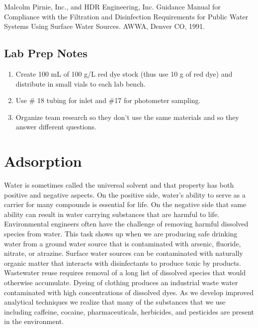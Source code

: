 \documentclass[letterpaper,10pt,english]{sphinxmanual}
\begin{document}
Malcolm Pirnie, Inc., and HDR Engineering, Inc. Guidance Manual for Compliance with the Filtration and Disinfection Requirements for Public Water Systems Using Surface Water Sources. AWWA, Denver CO, 1991.


\section{Lab Prep Notes}
\label{\detokenize{Reactor_Characteristics/Reactor_Characteristics:lab-prep-notes}}\label{\detokenize{Reactor_Characteristics/Reactor_Characteristics:heading-reactor-lab-prep-notes}}\begin{enumerate}
\item {} 
Create 100 mL of 100 g/L red dye stock (thus use 10 g of red dye) and distribute in small vials to each lab bench.

\item {} 
Use \# 18 tubing for inlet and \#17 for photometer sampling.

\item {} 
Organize team research so they don’t use the same materials and so they answer different questions.

\end{enumerate}


\chapter{Adsorption}
\label{\detokenize{Adsorption/Adsorption:adsorption}}\label{\detokenize{Adsorption/Adsorption:title-adsorption}}\label{\detokenize{Adsorption/Adsorption::doc}}
Water is sometimes called the universal solvent and that property has both positive and negative aspects. On the positive side, water’s ability to serve as a carrier for many compounds is essential for life. On the negative side that same ability can result in water carrying substances that are harmful to life. Environmental engineers often have the challenge of removing harmful dissolved species from water. This task shows up when we are producing safe drinking water from a ground water source that is contaminated with arsenic, fluoride, nitrate, or atrazine. Surface water sources can be contaminated with naturally organic matter that interacts with disinfectants to produce toxic by products. Wastewater reuse requires removal of a long list of dissolved species that would otherwise accumulate. Dyeing of clothing produces an industrial waste water contaminated with high concentrations of dissolved dyes. As we develop improved analytical techniques we realize that many of the substances that we use including caffeine, cocaine, pharmaceuticals, herbicides, and pesticides are present in the environment.
\end{document}
